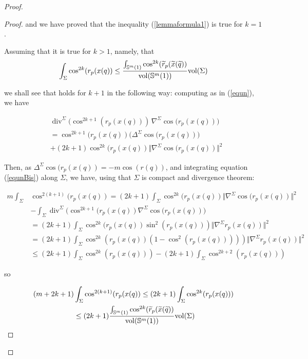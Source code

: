 \documentclass{amsart}
\theoremstyle{definition}
\theoremstyle{remark}
\newcommand{\Div}{\operatorname{div}}
\begin{document}
\begin{proof}
\begin{proof}
and we have proved that the inequality (\ref{lemmaformula1}) is true for $k=1$.

Assuming that it is true for $k >1$, namely, that
\begin{equation}\label{eqsisBis}
\int_\Sigma \cos^{2k}(r_p(x(q)) \leq \frac{\int_{\mathbb{S}^m(1)} \cos^{2k}(\widetilde{r}_p(\widetilde{x}(\widetilde{q}))}{{\rm vol}(\mathbb{S}^m(1))} {\rm vol}(\Sigma)
\end{equation}


\noindent  we shall see that holds for $k+1$ in the following way: computing as in (\ref{equn}), we have 

\begin{equation}\label{equnBis}
\begin{aligned}
&\Div^\Sigma\big(\cos^{2k+1} (r_p(x(q)))\,\nabla^\Sigma \cos(r_p(x(q))\big)\\&=\cos^{2k+1}(r_p(x(q))\big(\Delta^\Sigma\cos(r_p(x(q))\big)\\&+(2k+1) \cos^{2k}(r_p(x(q))\Vert \nabla^\Sigma \cos(r_p(x(q))\Vert^2
\end{aligned}
\end{equation}

 \noindent Then, as $\Delta^\Sigma \cos(r_p(x(q))=-m\cos(r(q))$, and integrating equation (\ref{equnBis}) along $\Sigma$, we have, using that $\Sigma$ is compact and divergence theorem:

\begin{equation}\label{eqdossBis}
\begin{aligned}
m\int_\Sigma& \cos^{2(k+1)}(r_p(x(q))=(2k+1)\int_\Sigma\cos^{2k}(r_p(x(q))\Vert \nabla^{\Sigma}  \cos(r_p(x(q))\Vert^2\\&-\int_\Sigma \Div^\Sigma\big(\cos^{2k+1}(r_p(x(q))\nabla^\Sigma \cos(r_p(x(q))\big)
\\&=(2k+1)\int_\Sigma \cos^{2k}(r_p(x(q))\sin^2(r_p(x(q)))\Vert \nabla^{\Sigma} r_p(x(q))\Vert^2\\&=(2k+1)\int_\Sigma \cos^{2k}(r_p(x(q))(1-\cos^2(r_p(x(q)))))\Vert \nabla^{\Sigma} r_p(x(q))\Vert^2\\&\leq (2k+1)\int_\Sigma \cos^{2k}(r_p(x(q)))-(2k+1)\int_\Sigma \cos^{2k+2}(r_p(x(q)))
\end{aligned}
\end{equation}

\noindent so

\begin{equation}\label{eqdoss2Bis}
\begin{aligned}
(m+2k+1)&\int_\Sigma \cos^{2(k+1)}(r_p(x(q))\leq (2k+1)\int_\Sigma \cos^{2k}(r_p(x(q)))\\ & \leq  (2k+1)\frac{\int_{\mathbb{S}^m(1)} \cos^{2k}(\widetilde{r}_p(\widetilde{x}(\widetilde{q}))}{{\rm vol}(\mathbb{S}^m(1))} {\rm vol}(\Sigma)
\end{aligned}
\end{equation}


\end{proof}
\end{proof}
\end{document}
